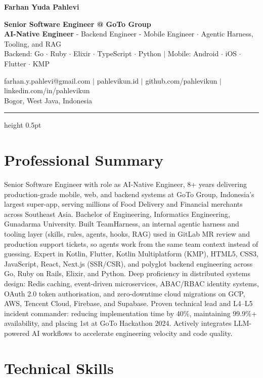 \documentclass[10pt]{article}
\begin{document}
{\LARGE \textbf{Farhan Yuda Pahlevi}}

\smallskip
{\small\textbf{Senior Software Engineer @ GoTo Group}\\
{\small\textbf{AI-Native Engineer} - Backend Engineer - Mobile Engineer $\cdot$ Agentic Harness, Tooling, and RAG}\\
{\small Backend: Go $\cdot$ Ruby $\cdot$ Elixir $\cdot$ TypeScript $\cdot$ Python $|$ Mobile: Android $\cdot$ iOS $\cdot$ Flutter $\cdot$ KMP}

\smallskip
farhan.y.pahlevi@gmail.com $|$ pahlevikun.id $|$ github.com/pahlevikun $|$ linkedin.com/in/pahlevikun\\
Bogor, West Java, Indonesia

\vspace{4pt}\hrule height 0.5pt\vspace{6pt}

\section*{Professional Summary}
Senior Software Engineer with role as AI-Native Engineer, 8+ years delivering production-grade mobile, web, and backend systems at GoTo Group, Indonesia's largest super-app, serving millions of Food Delivery and Financial merchants across Southeast Asia. Bachelor of Engineering, Informatics Engineering, Gunadarma University. Built TeamHarness, an internal agentic harness and tooling layer (skills, rules, agents, hooks, RAG) used in GitLab MR review and production support tickets, so agents work from the same team context instead of guessing. Expert in Kotlin, Flutter, Kotlin Multiplatform (KMP), HTML5, CSS3, JavaScript, React, Next.js (SSR/CSR), and polyglot backend engineering across Go, Ruby on Rails, Elixir, and Python. Deep proficiency in distributed systems design: Redis caching, event-driven microservices, ABAC/RBAC identity systems, OAuth 2.0 token authorisation, and zero-downtime cloud migrations on GCP, AWS, Tencent Cloud, Firebase, and Supabase. Proven technical lead and L4--L5 incident commander: reducing implementation time by 40\%, maintaining 99.9\%+ availability, and placing 1st at GoTo Hackathon 2024. Actively integrates LLM-powered AI workflows to accelerate engineering velocity and code quality.

\section*{Technical Skills}

}
\end{document}
